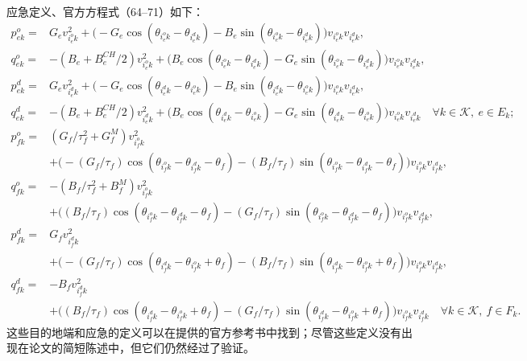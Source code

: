 \documentclass{article}
\begin{document}
应急定义、官方方程式（64–71）如下：
\begin{align*}
p_{ek}^o={}&G_ev_{i_e^o k}^2+
\bigl(-G_e\cos(\theta_{i_e^o k}-\theta_{i_e^d k})-B_e\sin(\theta_{i_e^o k}-\theta_{i_e^d k})\bigr)v_{i_e^o k}v_{i_e^d k},\\
q_{ek}^o={}&-(B_e+B_e^{CH}/2)v_{i_e^o k}^2+
\bigl(B_e\cos(\theta_{i_e^o k}-\theta_{i_e^d k})-G_e\sin(\theta_{i_e^o k}-\theta_{i_e^d k})\bigr)v_{i_e^o k}v_{i_e^d k},\\
p_{ek}^d={}&G_ev_{i_e^d k}^2+
\bigl(-G_e\cos(\theta_{i_e^d k}-\theta_{i_e^o k})-B_e\sin(\theta_{i_e^d k}-\theta_{i_e^o k})\bigr)v_{i_e^o k}v_{i_e^d k},\\
q_{ek}^d={}&-(B_e+B_e^{CH}/2)v_{i_e^d k}^2+
\bigl(B_e\cos(\theta_{i_e^d k}-\theta_{i_e^o k})-G_e\sin(\theta_{i_e^d k}-\theta_{i_e^o k})\bigr)v_{i_e^o k}v_{i_e^d k}
\quad\forall k\in\mathcal K,\ e\in E_k;
\end{align*}
\begin{align*}
p_{fk}^o={}&(G_f/\tau_f^2+G_f^M)v_{i_f^o k}^2\\
&+\bigl(-(G_f/\tau_f)\cos(\theta_{i_f^o k}-\theta_{i_f^d k}-\theta_f)
 -(B_f/\tau_f)\sin(\theta_{i_f^o k}-\theta_{i_f^d k}-\theta_f)\bigr)v_{i_f^o k}v_{i_f^d k},\\
q_{fk}^o={}&-(B_f/\tau_f^2+B_f^M)v_{i_f^o k}^2\\
&+\bigl((B_f/\tau_f)\cos(\theta_{i_f^o k}-\theta_{i_f^d k}-\theta_f)
 -(G_f/\tau_f)\sin(\theta_{i_f^o k}-\theta_{i_f^d k}-\theta_f)\bigr)v_{i_f^o k}v_{i_f^d k},\\
p_{fk}^d={}&G_fv_{i_f^d k}^2\\
&+\bigl(-(G_f/\tau_f)\cos(\theta_{i_f^d k}-\theta_{i_f^o k}+\theta_f)
 -(B_f/\tau_f)\sin(\theta_{i_f^d k}-\theta_{i_f^o k}+\theta_f)\bigr)v_{i_f^o k}v_{i_f^d k},\\
q_{fk}^d={}&-B_fv_{i_f^d k}^2\\
&+\bigl((B_f/\tau_f)\cos(\theta_{i_f^d k}-\theta_{i_f^o k}+\theta_f)
 -(G_f/\tau_f)\sin(\theta_{i_f^d k}-\theta_{i_f^o k}+\theta_f)\bigr)v_{i_f^o k}v_{i_f^d k}
\quad\forall k\in\mathcal K,\ f\in F_k.
\end{align*}
这些目的地端和应急的定义可以在提供的官方参考书中找到；尽管这些定义没有出现在论文的简短陈述中，但它们仍然经过了验证。
\end{document}
